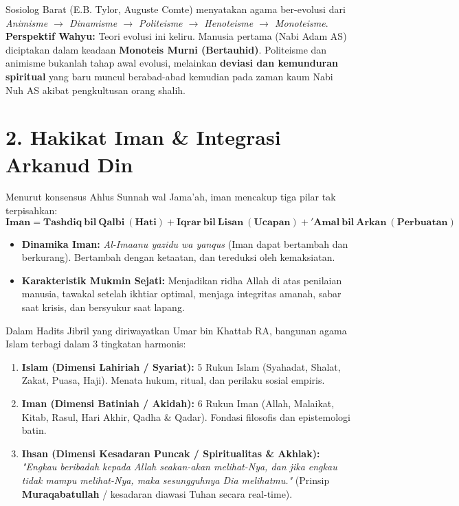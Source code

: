 \documentclass[10pt,a4paper]{article}
\begin{document}
\begin{warningbox}
Sosiolog Barat (E.B. Tylor, Auguste Comte) menyatakan agama ber-evolusi dari \textit{Animisme $\rightarrow$ Dinamisme $\rightarrow$ Politeisme $\rightarrow$ Henoteisme $\rightarrow$ Monoteisme}. \\
\textbf{Perspektif Wahyu:} Teori evolusi ini keliru. Manusia pertama (Nabi Adam AS) diciptakan dalam keadaan \textbf{Monoteis Murni (Bertauhid)}. Politeisme dan animisme bukanlah tahap awal evolusi, melainkan \textbf{deviasi dan kemunduran spiritual} yang baru muncul berabad-abad kemudian pada zaman kaum Nabi Nuh AS akibat pengkultusan orang shalih.
\end{warningbox}

\section*{\color{ugmblue}\Large 2. Hakikat Iman \& Integrasi Arkanud Din}

\begin{conceptbox}
Menurut konsensus Ahlus Sunnah wal Jama'ah, iman mencakup tiga pilar tak terpisahkan:
$$\mathbf{Iman = Tashdiq\ bil\ Qalbi\ (Hati) + Iqrar\ bil\ Lisan\ (Ucapan) + 'Amal\ bil\ Arkan\ (Perbuatan)}$$
\begin{itemize}
  \item \textbf{Dinamika Iman:} \textit{Al-Imaanu yazidu wa yanqus} (Iman dapat bertambah dan berkurang). Bertambah dengan ketaatan, dan tereduksi oleh kemaksiatan.
  \item \textbf{Karakteristik Mukmin Sejati:} Menjadikan ridha Allah di atas penilaian manusia, tawakal setelah ikhtiar optimal, menjaga integritas amanah, sabar saat krisis, dan bersyukur saat lapang.
\end{itemize}
\end{conceptbox}

\begin{dalilbox}
Dalam Hadits Jibril yang diriwayatkan Umar bin Khattab RA, bangunan agama Islam terbagi dalam 3 tingkatan harmonis:
\begin{enumerate}
  \item \textbf{Islam (Dimensi Lahiriah / Syariat):} 5 Rukun Islam (Syahadat, Shalat, Zakat, Puasa, Haji). Menata hukum, ritual, dan perilaku sosial empiris.
  \item \textbf{Iman (Dimensi Batiniah / Akidah):} 6 Rukun Iman (Allah, Malaikat, Kitab, Rasul, Hari Akhir, Qadha \& Qadar). Fondasi filosofis dan epistemologi batin.
  \item \textbf{Ihsan (Dimensi Kesadaran Puncak / Spiritualitas \& Akhlak):} \textit{"Engkau beribadah kepada Allah seakan-akan melihat-Nya, dan jika engkau tidak mampu melihat-Nya, maka sesungguhnya Dia melihatmu."} (Prinsip \textbf{Muraqabatullah} / kesadaran diawasi Tuhan secara real-time).
\end{enumerate}
\end{dalilbox}
\end{document}
